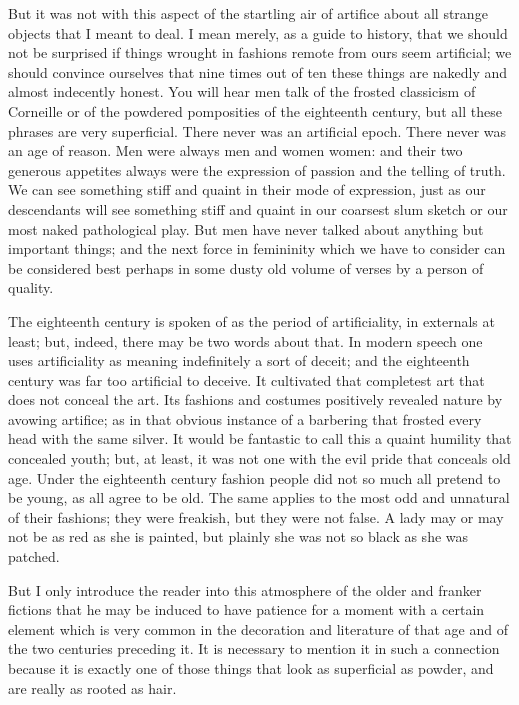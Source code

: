 \documentclass{book}
\begin{document}
But it was not with this aspect of the startling air of artifice about all strange objects that I meant to deal. I mean merely, as a guide to history, that we should not be surprised if things wrought in fashions remote from ours seem artificial; we should convince ourselves that nine times out of ten these things are nakedly and almost indecently honest. You will hear men talk of the frosted classicism of Corneille or of the powdered pomposities of the eighteenth century, but all these phrases are very superficial. There never was an artificial epoch. There never was an age of reason. Men were always men and women women: and their two generous appetites always were the expression of passion and the telling of truth. We can see something stiff and quaint in their mode of expression, just as our descendants will see something stiff and quaint in our coarsest slum sketch or our most naked pathological play. But men have never talked about anything but important things; and the next force in femininity which we have to consider can be considered best perhaps in some dusty old volume of verses by a person of quality.

The eighteenth century is spoken of as the period of artificiality, in externals at least; but, indeed, there may be two words about that. In modern speech one uses artificiality as meaning indefinitely a sort of deceit; and the eighteenth century was far too artificial to deceive. It cultivated that completest art that does not conceal the art. Its fashions and costumes positively revealed nature by avowing artifice; as in that obvious instance of a barbering that frosted every head with the same silver. It would be fantastic to call this a quaint humility that concealed youth; but, at least, it was not one with the evil pride that conceals old age. Under the eighteenth century fashion people did not so much all pretend to be young, as all agree to be old. The same applies to the most odd and unnatural of their fashions; they were freakish, but they were not false. A lady may or may not be as red as she is painted, but plainly she was not so black as she was patched.

But I only introduce the reader into this atmosphere of the older and franker fictions that he may be induced to have patience for a moment with a certain element which is very common in the decoration and literature of that age and of the two centuries preceding it. It is necessary to mention it in such a connection because it is exactly one of those things that look as superficial as powder, and are really as rooted as hair.
\end{document}
